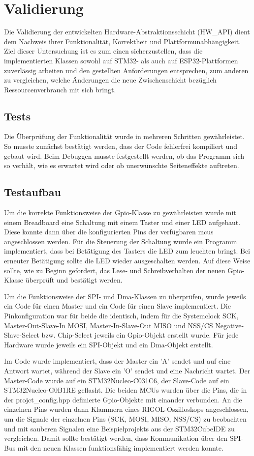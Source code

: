 \section{Validierung}
Die Validierung der entwickelten Hardware-Abstraktionsschicht (HW\_API) dient dem Nachweis ihrer Funktionalität, Korrektheit und Plattformunabhängigkeit. 
Ziel dieser Untersuchung ist es zum einen sicherzustellen, dass die implementierten Klassen sowohl auf STM32- als auch auf ESP32-Plattformen zuverlässig arbeiten und den gestellten Anforderungen entsprechen, zum anderen zu vergleichen, welche Änderungen die neue Zwischenschicht bezüglich Ressourcenverbrauch mit sich bringt.

\subsection{Tests}
Die Überprüfung der Funktionalität wurde in mehreren Schritten gewährleistet.
So musste zunächst bestätigt werden, dass der Code fehlerfrei kompiliert und gebaut wird.
Beim Debuggen musste festgestellt werden, ob das Programm sich so verhält, wie es erwartet wird oder ob unerwünschte Seiteneffekte auftreten.

\subsection*{Testaufbau}
Um die korrekte Funktionsweise der Gpio-Klasse zu gewährleisten wurde mit einem Breadboard eine Schaltung mit einem Taster und einer LED aufgebaut.
Diese konnte dann über die konfigurierten Pins der verfügbaren \gls{mcu}s angeschlossen werden.
Für die Steuerung der Schaltung wurde ein Programm implementiert, dass bei Betätigung des Tasters die LED zum leuchten bringt. 
Bei erneuter Betätigung sollte die LED wieder ausgeschalten werden.
Auf diese Weise sollte, wie zu Beginn gefordert, das Lese- und Schreibverhalten der neuen Gpio-Klasse überprüft und bestätigt werden.

Um die Funktionsweise der SPI- und Dma-Klassen zu überprüfen, wurde jeweils ein Code für einen Master und ein Code für einen Slave implementiert.
Die Pinkonfiguration war für beide die identisch, indem für die Systemclock SCK, Master-Out-Slave-In MOSI, Master-In-Slave-Out MISO und NSS/CS Negative-Slave-Select bzw. Chip-Select jeweils ein Gpio-Objekt erstellt wurde.
Für jede Hardware wurde jeweils ein SPI-Objekt und ein Dma-Objekt erstellt.

Im Code wurde implementiert, dass der Master ein 'A' sendet und auf eine Antwort wartet, während der Slave ein 'O' sendet und eine Nachricht wartet.
Der Master-Code wurde auf ein STM32Nucleo-C031C6, der Slave-Code auf ein STM32Nucleo-G0B1RE geflasht. 
Die beiden MCUs wurden über die Pins, die in der projct\_config.hpp definierte Gpio-Objekte mit einander verbunden.
An die einzelnen Pins wurden dann Klammern eines RIGOL-Oszilloskops \cite{rigol_dho900} angeschlossen, um die Signale der einzelnen Pins (SCK, MOSI, MISO, NSS/CS) zu beobachten und mit sauberen Signalen eine Beispielprojekts aus der STM32CubeIDE zu vergleichen.
Damit sollte bestätigt werden, dass Kommunikation über den SPI-Bus mit den neuen Klassen funktionsfähig implementiert werden konnte. 

